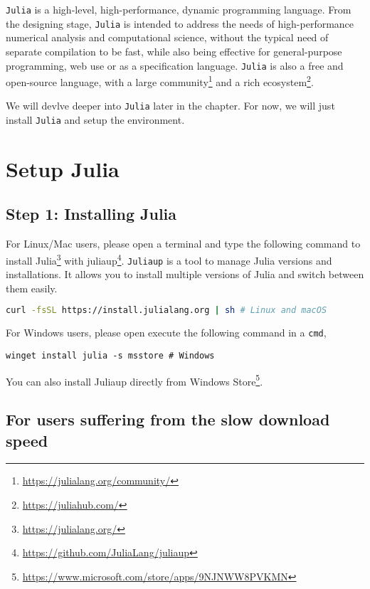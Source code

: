 \documentclass[
  notoc %
]{tufte-book}
\DeclareRobustCommand{\href}[2]{#2\footnote{\url{#1}}}
\newcommand{\passthrough}[1]{#1}
\begin{document}
\passthrough{\lstinline!Julia!} is a high-level, high-performance,
dynamic programming language. From the designing stage,
\passthrough{\lstinline!Julia!} is intended to address the needs of
high-performance numerical analysis and computational science, without
the typical need of separate compilation to be fast, while also being
effective for general-purpose programming, web use or as a specification
language. \passthrough{\lstinline!Julia!} is also a free and open-source
language, with a \href{https://julialang.org/community/}{large
community} and a \href{https://juliahub.com/}{rich ecosystem}.

We will devlve deeper into \passthrough{\lstinline!Julia!} later in the
chapter. For now, we will just install \passthrough{\lstinline!Julia!}
and setup the environment.

\hypertarget{sec:setup}{%
\section{Setup Julia}\label{sec:setup}}

\hypertarget{step-1-installing-julia}{%
\subsection{Step 1: Installing Julia}\label{step-1-installing-julia}}

For Linux/Mac users, please open a terminal and type the following
command to install \href{https://julialang.org/}{Julia} with
\href{https://github.com/JuliaLang/juliaup}{juliaup}.
\passthrough{\lstinline!Juliaup!} is a tool to manage Julia versions and
installations. It allows you to install multiple versions of Julia and
switch between them easily.

\begin{lstlisting}[language=bash]
curl -fsSL https://install.julialang.org | sh # Linux and macOS
\end{lstlisting}

For Windows users, please open execute the following command in a
\passthrough{\lstinline!cmd!},

\begin{lstlisting}
winget install julia -s msstore # Windows
\end{lstlisting}

You can also install Juliaup directly from
\href{https://www.microsoft.com/store/apps/9NJNWW8PVKMN}{Windows Store}.

\hypertarget{for-users-suffering-from-the-slow-download-speed}{%
\subsection{For users suffering from the slow download
speed}\label{for-users-suffering-from-the-slow-download-speed}}
\end{document}
